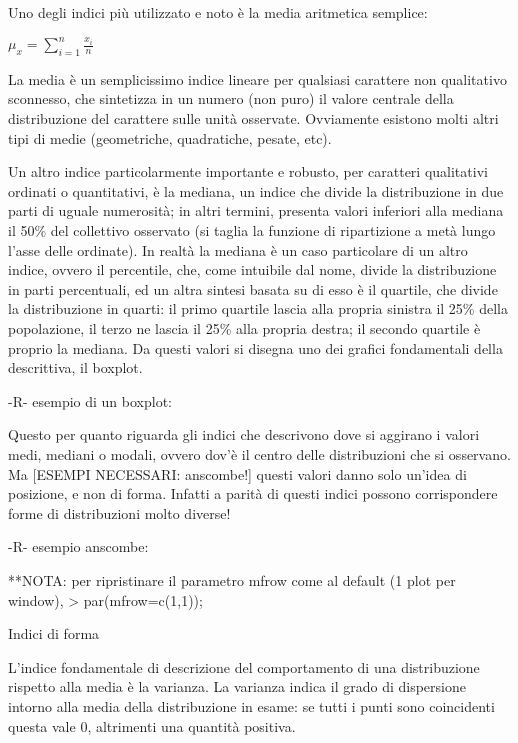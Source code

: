\documentclass{book}
\begin{document}
Uno degli indici più utilizzato e noto \`{e} la media aritmetica semplice:

 $\mu_x=\sum_{i=1}^n \frac{x_i}{n}$


La media \`{e} un semplicissimo indice lineare per qualsiasi carattere non qualitativo sconnesso, che sintetizza in un numero (non puro) il valore centrale della distribuzione del carattere sulle unit\`{a} osservate. Ovviamente esistono molti altri tipi di medie (geometriche, quadratiche, pesate, etc).

Un altro indice particolarmente importante e robusto, per caratteri qualitativi ordinati o quantitativi, \`{e} la mediana, un indice che divide la distribuzione in due parti di uguale numerosit\`{a}; in altri termini, presenta valori inferiori alla mediana il 50\% del collettivo osservato (si taglia la funzione di ripartizione a met\`{a} lungo l'asse delle ordinate).
In realt\`{a} la mediana \`{e} un caso particolare di un altro indice, ovvero il percentile, che, come intuibile dal nome, divide la distribuzione in parti percentuali, ed un altra sintesi basata su di esso \`{e} il quartile, che divide la distribuzione in quarti: il primo quartile lascia alla propria sinistra il 25\% della popolazione, il terzo ne lascia il 25\% alla propria destra; il secondo quartile \`{e} proprio la mediana.
Da questi valori si disegna uno dei grafici fondamentali della descrittiva, il boxplot.

	-R-
esempio di un boxplot:

\lstset{language=R}


Questo per quanto riguarda gli indici che descrivono dove si aggirano i valori medi, mediani o modali, ovvero dov'\`{e} il centro delle distribuzioni che si osservano. Ma [ESEMPI NECESSARI: anscombe!] questi valori danno solo un'idea di posizione, e non di forma. Infatti a parit\`{a} di questi indici possono corrispondere forme di distribuzioni molto diverse!

	-R-
esempio anscombe:



**NOTA: per ripristinare il parametro mfrow come al default (1 plot per window), > par(mfrow=c(1,1));

Indici di forma

L'indice fondamentale di descrizione del comportamento di una distribuzione rispetto alla media \`{e} la varianza.
La varianza indica il grado di dispersione intorno alla media della distribuzione in esame: se tutti i punti sono coincidenti questa vale 0, altrimenti una quantit\`{a} positiva.
\end{document}
